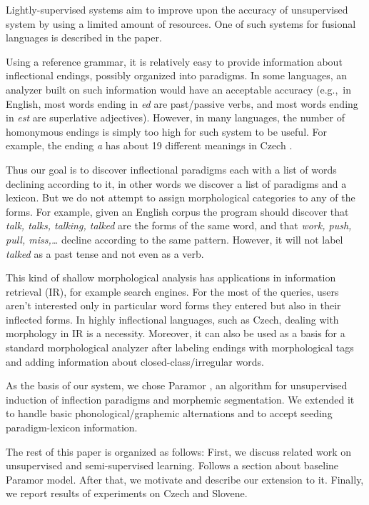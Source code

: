 \documentclass[11pt]{article}
\newcommand{\e}[1]{\textit{#1}} %
\newcommand{\eg}{e.g.,~}
\begin{document}
Lightly-supervised systems aim to improve upon the accuracy of unsupervised system by using a limited amount of resources. One of such systems for fusional languages is described in the paper.

Using a reference grammar, it is relatively easy to provide information about inflectional endings, possibly organized into paradigms. In some languages, an analyzer built on such information would have an acceptable accuracy (\eg in English, most words ending in \e{ed} are past/passive verbs, and most words ending in \e{est} are superlative adjectives). However, in many languages, the number of homonymous endings is simply too high for such system to be useful. For example, the ending \e{a} has about 19 different meanings in Czech \cite{feldman-hana-2010-rodopi}.

Thus our goal is to discover inflectional paradigms each with a list of words declining according to it, in other words we discover a list of paradigms and a lexicon. But we do not attempt to assign morphological categories to any of the forms. For example, given an English corpus the program should discover that \e{talk, talks, talking, talked} are the forms of the same word, and that \e{work, push, pull, miss,\ldots} decline according to the same pattern. However, it will not label \e{talked} as a past tense and not even as a verb.

This kind of shallow morphological analysis has applications in information retrieval (IR), for example search engines. For the most of the queries, users aren't interested only in particular word forms they entered but also in their inflected forms. In highly inflectional languages, such as Czech, dealing with morphology in IR is a necessity. Moreover, it can also be used as a basis for a standard morphological analyzer after labeling endings with morphological tags and adding information about closed-class/irregular words.

As the basis of our system, we chose Paramor \cite{monson09}, an algorithm for unsupervised induction of inflection paradigms and morphemic segmentation. We extended it to handle basic phonological/graphemic alternations and to accept seeding paradigm-lexicon information.


The rest of this paper is organized as follows: First, we discuss related work on unsupervised and semi-supervised learning. Follows a section about baseline Paramor model. After that, we motivate and describe our extension to it. Finally, we report results of experiments on Czech and Slovene.
\end{document}

